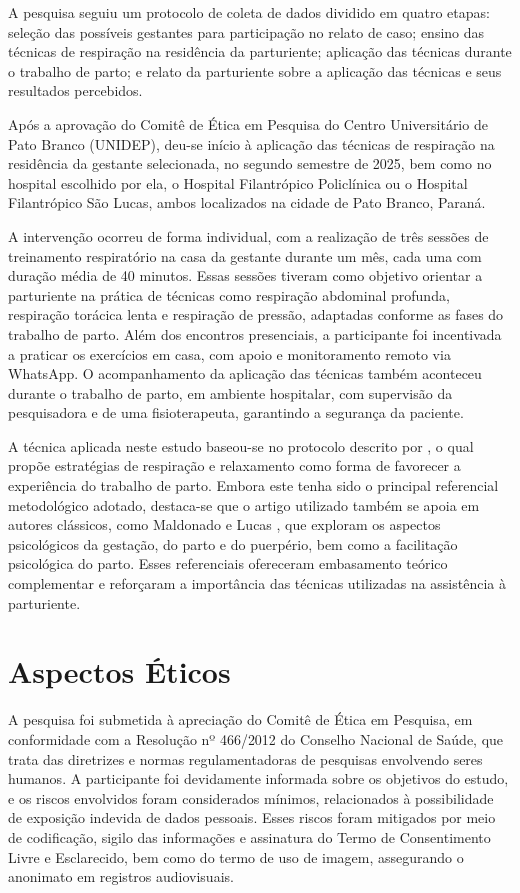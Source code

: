 \documentclass[openright]{tex/estilos/normas-utf-tex}
\begin{document}
A pesquisa seguiu um protocolo de coleta de dados dividido em quatro etapas: seleção das possíveis gestantes para participação no relato de caso; ensino das técnicas de respiração na residência da parturiente; aplicação das técnicas durante o trabalho de parto; e relato da parturiente sobre a aplicação das técnicas e seus resultados percebidos.

Após a aprovação do Comitê de Ética em Pesquisa do Centro Universitário de Pato Branco (UNIDEP), deu-se início à aplicação das técnicas de respiração na residência da gestante selecionada, no segundo semestre de 2025, bem como no hospital escolhido por ela, o Hospital Filantrópico Policlínica ou o Hospital Filantrópico São Lucas, ambos localizados na cidade de Pato Branco, Paraná.

A intervenção ocorreu de forma individual, com a realização de três sessões de treinamento respiratório na casa da gestante durante um mês, cada uma com duração média de 40 minutos. Essas sessões tiveram como objetivo orientar a parturiente na prática de técnicas como respiração abdominal profunda, respiração torácica lenta e respiração de pressão, adaptadas conforme as fases do trabalho de parto. Além dos encontros presenciais, a participante foi incentivada a praticar os exercícios em casa, com apoio e monitoramento remoto via WhatsApp. O acompanhamento da aplicação das técnicas também aconteceu durante o trabalho de parto, em ambiente hospitalar, com supervisão da pesquisadora e de uma fisioterapeuta, garantindo a segurança da paciente.

A técnica aplicada neste estudo baseou-se no protocolo descrito por , o qual propõe estratégias de respiração e relaxamento como forma de favorecer a experiência do trabalho de parto. Embora este tenha sido o principal referencial metodológico adotado, destaca-se que o artigo utilizado também se apoia em autores clássicos, como Maldonado \citeyear{maldonado1991} e Lucas \citeyear{lucas1983}, que exploram os aspectos psicológicos da gestação, do parto e do puerpério, bem como a facilitação psicológica do parto. Esses referenciais ofereceram embasamento teórico complementar e reforçaram a importância das técnicas utilizadas na assistência à parturiente.

\section{Aspectos Éticos}
\label{sec:etica}

A pesquisa foi submetida à apreciação do Comitê de Ética em Pesquisa, em conformidade com a Resolução nº 466/2012 do Conselho Nacional de Saúde, que trata das diretrizes e normas regulamentadoras de pesquisas envolvendo seres humanos. A participante foi devidamente informada sobre os objetivos do estudo, e os riscos envolvidos foram considerados mínimos, relacionados à possibilidade de exposição indevida de dados pessoais. Esses riscos foram mitigados por meio de codificação, sigilo das informações e assinatura do Termo de Consentimento Livre e Esclarecido, bem como do termo de uso de imagem, assegurando o anonimato em registros audiovisuais.
\end{document}
